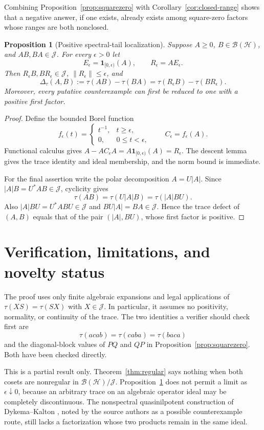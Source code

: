 \documentclass[11pt]{article}
\newtheorem{proposition}[theorem]{Proposition}
\theoremstyle{remark}
\newcommand{\BH}{\mathcal B(\mathcal H)}
\newcommand{\JJ}{\mathcal J}
\newcommand{\trc}{\tau}
\newcommand{\deltaT}[2]{\Delta_{\trc}(#1,#2)}
\begin{document}
Combining Proposition~\ref{prop:squarezero} with
Corollary~\ref{cor:closed-range} shows that a negative answer, if one exists,
already exists among square-zero factors whose ranges are both nonclosed.

\begin{proposition}[Positive spectral-tail localization]\label{prop:tail}
Suppose $A\geq0$, $B\in\BH$, and $AB,BA\in\JJ$.  For every $\epsilon>0$ let
\[
 E_\epsilon=\mathbf 1_{[0,\epsilon)}(A),
 \qquad R_\epsilon=AE_\epsilon.
\]
Then $R_\epsilon B,BR_\epsilon\in\JJ$, $\|R_\epsilon\|\leq\epsilon$, and
\[
 \deltaT{A}{B}:=\trc(AB)-\trc(BA)
 =\trc(R_\epsilon B)-\trc(BR_\epsilon).
\]
Moreover, every putative counterexample can first be reduced to one with a
positive first factor.
\end{proposition}

\begin{proof}
Define the bounded Borel function
\[
 f_\epsilon(t)=
 \begin{cases}t^{-1},&t\geq\epsilon,\\0,&0\leq t<\epsilon,
 \end{cases}
 \qquad C_\epsilon=f_\epsilon(A).
\]
Functional calculus gives
$A-AC_\epsilon A=A\mathbf 1_{[0,\epsilon)}(A)=R_\epsilon$.
The descent lemma gives the trace identity and ideal membership, and the norm
bound is immediate.

For the final assertion write the polar decomposition $A=U|A|$.  Since
$|A|B=U^*AB\in\JJ$, cyclicity gives
\[
 \trc(AB)=\trc(U|A|B)=\trc(|A|BU).
\]
Also $|A|BU=U^*ABU\in\JJ$ and $BU|A|=BA\in\JJ$.  Hence the trace defect of
$(A,B)$ equals that of the pair $(|A|,BU)$, whose first factor is positive.
\end{proof}

\section{Verification, limitations, and novelty status}

The proof uses only finite algebraic expansions and legal applications of
$\trc(XS)=\trc(SX)$ with $X\in\JJ$.  In particular, it assumes no positivity,
normality, or continuity of the trace.  The two identities a verifier should
check first are
\[
 \trc(acab)=\trc(caba)=\trc(baca)
\]
and the diagonal-block values of $PQ$ and $QP$ in
Proposition~\ref{prop:squarezero}.  Both have been checked directly.

This is a partial result only.  Theorem~\ref{thm:regular} says nothing when
both cosets are nonregular in $\BH/\JJ$.  Proposition~\ref{prop:tail} does not
permit a limit as $\epsilon\downarrow0$, because an arbitrary trace on an
algebraic operator ideal may be completely discontinuous.  The nonspectral
quasinilpotent construction of Dykema--Kalton \cite{DykemaKalton1998}, noted by
the source authors as a possible counterexample route, still lacks a
factorization whose two products remain in the same ideal.
\end{document}
